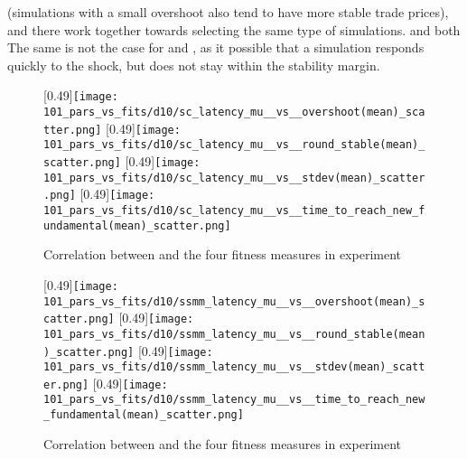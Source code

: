  (simulations with a small overshoot also tend to have more stable trade prices), and there work together towards selecting the same type of simulations. \timetoreachnewfundamental and \roundstable both  The same is not the case for \timetoreachnewfundamental and \roundstable, as it possible that a simulation responds quickly to the shock, but does not stay within the stability margin. 




\begin{figure}
	\centering
	[0.49\linewidth]{\texttt{[image: 101\_pars\_vs\_fits/d10/sc\_latency\_mu\_\_vs\_\_overshoot(mean)\_scatter.png]}}
	[0.49\linewidth]{\texttt{[image: 101\_pars\_vs\_fits/d10/sc\_latency\_mu\_\_vs\_\_round\_stable(mean)\_scatter.png]}}
	[0.49\linewidth]{\texttt{[image: 101\_pars\_vs\_fits/d10/sc\_latency\_mu\_\_vs\_\_stdev(mean)\_scatter.png]}}
	[0.49\linewidth]{\texttt{[image: 101\_pars\_vs\_fits/d10/sc\_latency\_mu\_\_vs\_\_time\_to\_reach\_new\_fundamental(mean)\_scatter.png]}}
	
	\caption{Correlation between \sclatencymu and the four fitness measures in experiment \dten}
	\label{fig:d10_parvfit_sclatencymu}
\end{figure}

\begin{figure}
	\centering
	[0.49\linewidth]{\texttt{[image: 101\_pars\_vs\_fits/d10/ssmm\_latency\_mu\_\_vs\_\_overshoot(mean)\_scatter.png]}}
	[0.49\linewidth]{\texttt{[image: 101\_pars\_vs\_fits/d10/ssmm\_latency\_mu\_\_vs\_\_round\_stable(mean)\_scatter.png]}}
	[0.49\linewidth]{\texttt{[image: 101\_pars\_vs\_fits/d10/ssmm\_latency\_mu\_\_vs\_\_stdev(mean)\_scatter.png]}}
	[0.49\linewidth]{\texttt{[image: 101\_pars\_vs\_fits/d10/ssmm\_latency\_mu\_\_vs\_\_time\_to\_reach\_new\_fundamental(mean)\_scatter.png]}}
	
	\caption{Correlation between \sclatencymu and the four fitness measures in experiment \dten}
	\label{fig:d10_parvfit_ssmmlatencymu}
\end{figure}


